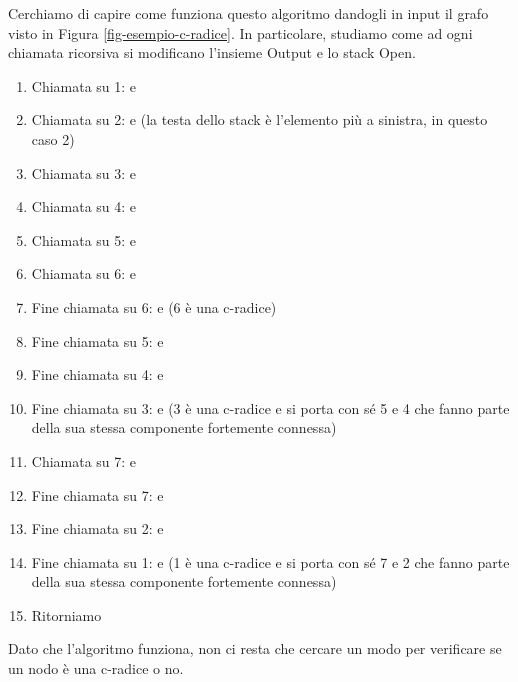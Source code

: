 \documentclass[11pt, a4paper, titlepage, oneside]{scrbook}
\begin{document}
Cerchiamo di capire come funziona questo algoritmo dandogli in input il grafo visto in Figura \ref{fig-esempio-c-radice}. In particolare, studiamo come ad ogni chiamata ricorsiva si modificano l'insieme Output e lo stack Open.
\begin{enumerate}[label=\arabic*°]
    \item Chiamata su 1:  e 
    \item Chiamata su 2:  e  (la testa dello stack è l'elemento più a sinistra, in questo caso 2)
    \item Chiamata su 3:  e 
    \item Chiamata su 4:  e 
    \item Chiamata su 5:  e  
    \item Chiamata su 6:  e 
    \item Fine chiamata su 6:  e  (6 è una c-radice)
    \item Fine chiamata su 5:  e  
    \item Fine chiamata su 4:  e  
    \item Fine chiamata su 3:  e  (3 è una c-radice e si porta con sé 5 e 4 che fanno parte della sua stessa componente fortemente connessa)
    \item Chiamata su 7:  e 
    \item Fine chiamata su 7:  e 
    \item Fine chiamata su 2:  e 
    \item Fine chiamata su 1:  e  (1 è una c-radice e si porta con sé 7 e 2 che fanno parte della sua stessa componente fortemente connessa)
    \item Ritorniamo 
\end{enumerate}

Dato che l'algoritmo funziona, non ci resta che cercare un modo per verificare se un nodo è una c-radice o no.
\end{document}
